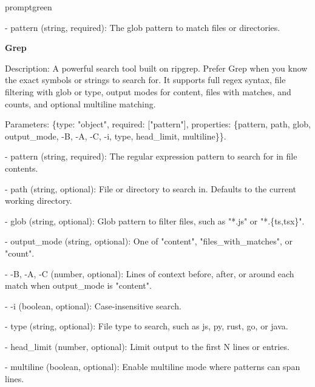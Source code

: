 \documentclass{llmxive}
\begin{document}
\begin{promptbox}{promptgreen}
{- pattern (string, required): The glob pattern to match files or directories.\par
\vspace{0.35em}\par
\textbf{Grep}\par
Description: A powerful search tool built on ripgrep. Prefer Grep when you know the exact symbols or strings to search for. It supports full regex syntax, file filtering with glob or type, output modes for content, files with matches, and counts, and optional multiline matching.\par
Parameters: \{type: "object", required: ["pattern"], properties: \{pattern, path, glob, output\_mode, -B, -A, -C, -i, type, head\_limit, multiline\}\}.\par
- pattern (string, required): The regular expression pattern to search for in file contents.\par
- path (string, optional): File or directory to search in. Defaults to the current working directory.\par
- glob (string, optional): Glob pattern to filter files, such as "*.js" or "*.\{ts,tsx\}".\par
- output\_mode (string, optional): One of "content", "files\_with\_matches", or "count".\par
- -B, -A, -C (number, optional): Lines of context before, after, or around each match when output\_mode is "content".\par
- -i (boolean, optional): Case-insensitive search.\par
- type (string, optional): File type to search, such as js, py, rust, go, or java.\par
- head\_limit (number, optional): Limit output to the first N lines or entries.\par
- multiline (boolean, optional): Enable multiline mode where patterns can span lines.\par
}
\end{promptbox}
\end{document}
